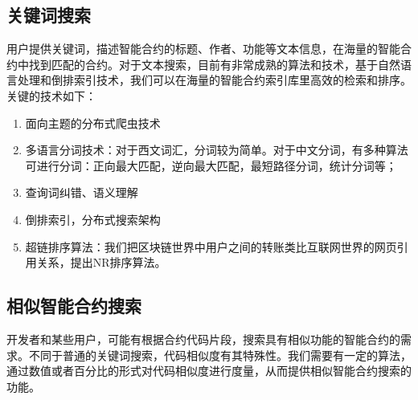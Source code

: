 \subsection{关键词搜索}
用户提供关键词，描述智能合约的标题、作者、功能等文本信息，在海量的智能合约中找到匹配的合约。对于文本搜索，目前有非常成熟的算法和技术，基于自然语言处理和倒排索引技术，我们可以在海量的智能合约索引库里高效的检索和排序。关键的技术如下：
\begin{enumerate}
	\item 面向主题的分布式爬虫技术
	\item 多语言分词技术：对于西文词汇，分词较为简单。对于中文分词，有多种算法可进行分词：正向最大匹配，逆向最大匹配，最短路径分词，统计分词等；
	\item 查询词纠错、语义理解
	\item 倒排索引，分布式搜索架构
	\item 超链排序算法：我们把区块链世界中用户之间的转账类比互联网世界的网页引用关系，提出NR排序算法。
\end{enumerate}


\subsection{相似智能合约搜索}
开发者和某些用户，可能有根据合约代码片段，搜索具有相似功能的智能合约的需求。不同于普通的关键词搜索，代码相似度有其特殊性。我们需要有一定的算法，通过数值或者百分比的形式对代码相似度进行度量，从而提供相似智能合约搜索的功能。

